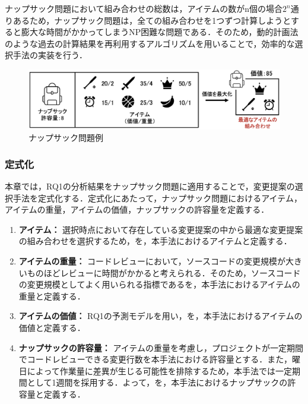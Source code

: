\documentclass[submit,ses,noauthor]{ipsj}
\begin{document}
ナップサック問題において組み合わせの総数は，アイテムの数がn個の場合\( 2^n \)通りあるため，ナップサック問題は，全ての組み合わせを1つずつ計算しようとすると膨大な時間がかかってしまうNP困難な問題である．そのため，動的計画法のような過去の計算結果を再利用するアルゴリズムを用いることで，効率的な選択手法の実装を行う．

\begin{figure}[t]
\begin{center}
\includegraphics[width=0.9\linewidth]{fig/knapsack.eps}
\caption{ナップサック問題例}
\label{fig:knapsack}
\end{center}
\end{figure}


\subsubsection{定式化}
本章では，RQ1の分析結果をナップサック問題に適用することで，変更提案の選択手法を定式化する．定式化にあたって，ナップサック問題におけるアイテム，アイテムの重量，アイテムの価値，ナップサックの許容量を定義する．

\begin{enumerate}
  \item{\textbf{アイテム：}}
  選択時点において存在している変更提案の中から最適な変更提案の組み合わせを選択するため，を，本手法におけるアイテムと定義する．
  \item{\textbf{アイテムの重量：}}
  コードレビューにおいて，ソースコードの変更規模が大きいものほどレビューに時間がかかると考えられる．そのため，ソースコードの変更規模としてよく用いられる指標である\cite{diff}を，本手法におけるアイテムの重量と定義する．
  \item{\textbf{アイテムの価値：}}  
  RQ1の予測モデルを用い，を，本手法におけるアイテムの価値と定義する．
  \item{\textbf{ナップサックの許容量：}}
  アイテムの重量を考慮し，プロジェクトが一定期間でコードレビューできる変更行数を本手法における許容量とする．また，曜日によって作業量に差異が生じる可能性を排除するため，本手法では一定期間として1週間を採用する．よって，を，本手法におけるナップサックの許容量と定義する．
\end{enumerate}
\end{document}
